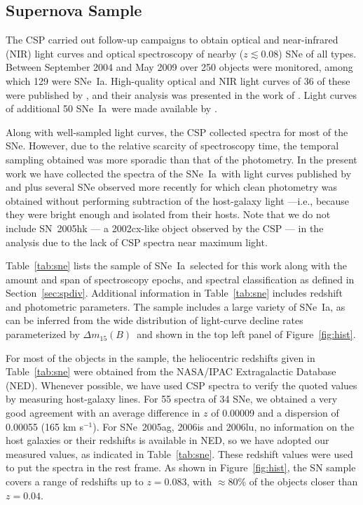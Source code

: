\documentclass[apj]{emulateapj-rtx4}
\newcommand{\dm}{$\Delta m_{15}(B)$}
\newcommand{\sneia}{SNe~Ia}
\begin{document}
\subsection{Supernova Sample}
\label{sec:sne}

The CSP carried out follow-up campaigns to obtain optical and
near-infrared (NIR) light curves and optical spectroscopy of nearby
($z \lesssim 0.08$) SNe of all types. Between September 2004 and May
2009 over 250 objects were monitored, among which 129 were
\sneia. High-quality optical and NIR light curves of 36 of these were
published by \citet{contreras10}, and their analysis was presented in
the work of \citet{folatelli10}. Light curves of additional 50 \sneia\
were made available by \citet{stritzinger11}. 

Along with well-sampled light curves, the CSP collected spectra for most
of the SNe. However, due to the relative scarcity of spectroscopy time, the
temporal sampling obtained was more sporadic than that of the photometry.
In the present work we have collected the spectra of the \sneia\ with
light curves published by \citet{contreras10} and \citet{stritzinger11}
plus several SNe observed more recently for which clean photometry was
obtained without performing subtraction of the host-galaxy light
---i.e., because they were bright enough and isolated from their 
 hosts. Note that we do not include SN~2005hk --- a 2002cx-like object 
 observed by the CSP \citep{phillips07} --- in the analysis 
 due to the lack of CSP spectra near maximum light.

Table~\ref{tab:sne} lists the sample of \sneia\ selected for this
work along with the amount and span of spectroscopy epochs, and
spectral classification as defined in
Section~\ref{sec:spdiv}. Additional information in
  Table~\ref{tab:sne} includes redshift and photometric parameters.
The sample includes a large variety of \sneia, as can be inferred from
the wide distribution of light-curve decline rates parameterized by
\dm\ and shown in the top left panel of Figure~\ref{fig:hist}.  

For most of the objects in the sample, the heliocentric redshifts given in
Table~\ref{tab:sne} were obtained from the NASA/IPAC Extragalactic
Database (NED). Whenever possible, we have used CSP spectra to verify
the quoted values by measuring host-galaxy lines. For 55 spectra
of 34 SNe, we obtained a very good agreement with an average
difference in $z$ of 0.00009 and a dispersion of
0.00055 (165 km s$^{-1}$). 
For SNe~2005ag, 2006is and 2006lu, no information on the host galaxies or
their redshifts is available in NED, so we have adopted our measured
values, as indicated in Table~\ref{tab:sne}. These redshift values
were used to put the spectra in the rest frame. As shown in
Figure~\ref{fig:hist}, the SN sample covers a range of redshifts up to
$z=0.083$, with $\approx$80\% of the objects closer than $z=0.04$.
\end{document}
